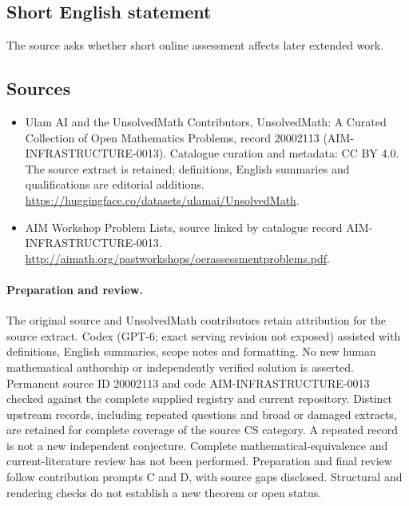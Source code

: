 \documentclass[11pt]{article}
\begin{document}
\subsection{Short English statement}
The source asks whether short online assessment affects later extended work.
\subsection{Sources}
\begin{itemize}
\item[\hypertarget{source:20002113:1}{S1}] Ulam AI and the UnsolvedMath Contributors, UnsolvedMath: A Curated Collection of Open Mathematics Problems, record 20002113 (AIM-INFRASTRUCTURE-0013). Catalogue curation and metadata: CC BY 4.0. The source extract is retained; definitions, English summaries and qualifications are editorial additions.
\url{https://huggingface.co/datasets/ulamai/UnsolvedMath}.
\item[\hypertarget{source:20002113:2}{S2}] AIM Workshop Problem Lists, source linked by catalogue record AIM-INFRASTRUCTURE-0013.
\url{http://aimath.org/pastworkshops/oerassessmentproblems.pdf}.
\end{itemize}
\paragraph{Preparation and review.}
The original source and UnsolvedMath contributors retain attribution for the source extract. Codex (GPT-6; exact serving revision not exposed) assisted with definitions, English summaries, scope notes and formatting. No new human mathematical authorship or independently verified solution is asserted. Permanent source ID 20002113 and code AIM-INFRASTRUCTURE-0013 checked against the complete supplied registry and current repository. Distinct upstream records, including repeated questions and broad or damaged extracts, are retained for complete coverage of the source CS category. A repeated record is not a new independent conjecture. Complete mathematical-equivalence and current-literature review has not been performed. Preparation and final review follow contribution prompts C and D, with source gaps disclosed. Structural and rendering checks do not establish a new theorem or open status.
\label{end:20002113}
\end{document}
